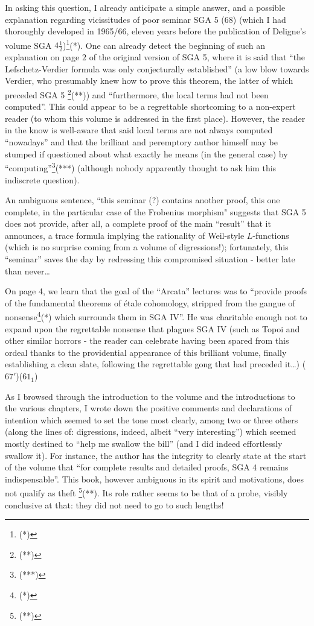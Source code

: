 In asking this question, I already anticipate a simple answer, and a possible explanation
regarding vicissitudes of poor seminar SGA 5 (68)
(which I had thoroughly developed in 1965/66, eleven years before the publication of
Deligne's volume SGA $4\frac{1}{2}$)\footnote{(*)}(*).
One can already detect the beginning of such an explanation on page $2$ of the original
version of SGA 5, where it is said that ``the Lefschetz-Verdier formula was only
conjecturally established'' (a low blow towards Verdier, who 
presumably knew how to prove this theorem, the latter of which preceded SGA 5
\footnote{(**)}(**)) 
and ``furthermore, the local terms had not been computed''.
This could appear to be a regrettable shortcoming to a non-expert reader (to whom this
volume is addressed in the first place).
However, the reader in the know is well-aware that said local terms are not always
computed ``nowadays'' and that the brilliant and peremptory 
author himself may be stumped if questioned about what exactly he means (in the 
general case) by ``computing''\footnote{(***)}(***)
(although nobody apparently thought to ask him this indiscrete question).

An ambiguous sentence, ``this seminar (?) contains another 
proof, this one complete, in the particular case of the Frobenius morphism"
suggests that SGA 5 does not provide, after all, a complete proof of the main ``result''
that it announces, a trace formula implying the rationality of Weil-style $L$-functions
(which is no surprise coming from a volume of digressions!); fortunately, this ``seminar''
saves the day by redressing this compromised situation - better late than never\ldots

On page 4, we learn that the goal of the ``Arcata'' lectures was to 
``provide proofs of the fundamental theorems of \'etale cohomology, stripped from the
gangue of nonsense\footnote{(*)}(*) which surrounds them in SGA IV''.
He was charitable enough not to expand upon the regrettable nonsense that plagues SGA IV
(such as Topoi and other similar horrors - the reader can celebrate having been spared from
this ordeal thanks to the providential appearance of this brilliant volume, finally
establishing a clean slate, following the regrettable gong that had preceded it\ldots)
($67'$)($61_1$)

As I browsed through the introduction to the volume and the introductions to the various
chapters, I wrote down the positive comments and declarations of intention 
which seemed to set the tone most clearly, among two or three others (along the lines of:
digressions, indeed, albeit ``very interesting'') which seemed mostly destined to ``help
me swallow the bill'' (and I did indeed effortlessly swallow it).
For instance, the author has the integrity to clearly state at the start of the volume
that ``for complete results and detailed proofs, SGA 4 remains indispensable''.
This book, however ambiguous in its spirit and motivations, does not qualify as theft
\footnote{(**)}(**).
Its role rather seems to be that of a probe, visibly conclusive at that:
they did not need to go to such lengths!

